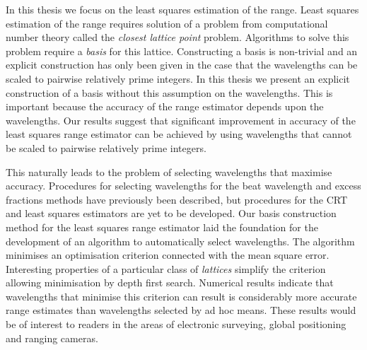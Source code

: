 In this thesis we focus on the least squares estimation of the range. Least squares estimation of the range requires solution of a problem from computational number theory called the \emph{closest lattice point} problem.  Algorithms to solve this problem require a \emph{basis} for this lattice.  Constructing a basis is non-trivial and an explicit construction has only been given in the case that the wavelengths can be scaled to pairwise relatively prime integers.  In this thesis we present an explicit construction of a basis without this assumption on the wavelengths.  This is important because the accuracy of the range estimator depends upon the wavelengths.  Our results suggest that significant improvement in accuracy of the least squares range estimator can be achieved by using wavelengths that cannot be scaled to pairwise relatively prime integers.
 
This naturally leads to the problem of selecting wavelengths that maximise accuracy.  Procedures for selecting wavelengths for the beat wavelength and excess fractions methods have previously been described, but procedures for the CRT and least squares estimators are yet to be developed.  Our basis construction method for the least squares range estimator laid the foundation for the development of an algorithm to automatically select wavelengths. The algorithm minimises an optimisation criterion connected with the mean square error. Interesting properties of a particular class of \emph{lattices} simplify the criterion allowing minimisation by depth first search.  Numerical results indicate that wavelengths that minimise this criterion can result is considerably more accurate range estimates than wavelengths selected by ad hoc means. These results would be of interest to readers in the areas of electronic surveying, global positioning and ranging cameras. 